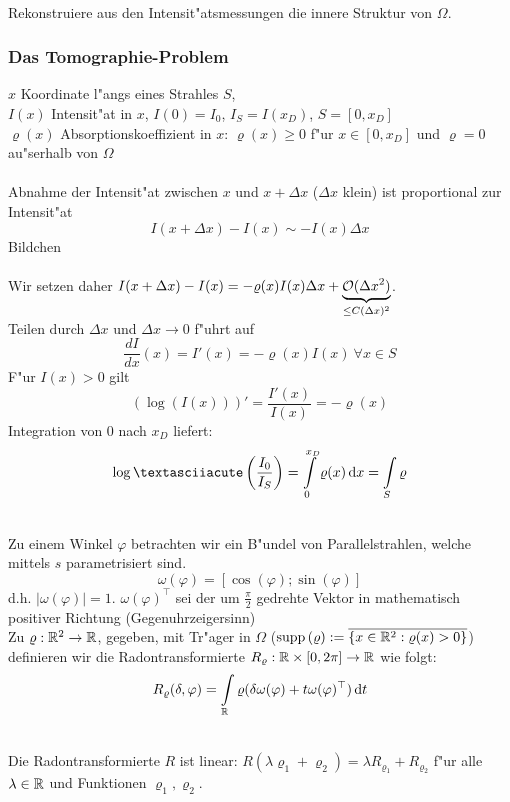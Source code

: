 \documentclass{scrartcl}
\begin{document}
 \\
Rekonstruiere aus den Intensit"atsmessungen die innere Struktur von $\Omega$.

\subsubsection{Das Tomographie-Problem}
$x$ Koordinate l"angs eines Strahles $S$, \\
$I(x)$ Intensit"at in $x$, $I(0) = I_0$, $I_S = I(x_D)$, $S = [ 0, x_D]$\\
$\varrho(x)$ Absorptionskoeffizient in $x$: $\varrho(x) \geq 0$ f"ur $x \in [0, x_D]$ und $\varrho = 0$ au"serhalb von $\Omega$ \\

 \\
Abnahme der Intensit"at zwischen $x$ und $x + \Delta x$ ($\Delta x$ klein) ist proportional zur Intensit"at 
$$I(x+ \Delta x) - I(x) \sim - I(x) \Delta x$$
Bildchen \\ \\
Wir setzen daher $I(x + \Delta x) - I(x) = - \varrho(x) I(x) \Delta x + \underbrace{\mathcal{O}(\Delta x^2)}_{\leq C(\Delta x)^2}$. \\
Teilen durch $\Delta x$ und $\Delta x \rightarrow 0$ f"uhrt auf
$$ \frac{dI}{dx}(x) = I'(x) = - \varrho(x) I(x) \ \forall x \in S$$
F"ur $I(x) > 0$ gilt
$$(\log (I(x)))' = \frac{I'(x)}{I(x)} = - \varrho(x)$$
Integration von $0$ nach $x_D$ liefert:
$$ \log´\left(\frac{I_0}{I_S}\right) = \int\limits_{0}^{x_D} \varrho(x) \d x = \int\limits_{S} \varrho$$

 \\
Zu einem Winkel $\varphi$ betrachten wir ein B"undel von Parallelstrahlen, welche mittels $s$ parametrisiert sind.
$$\omega(\varphi) = [ \cos (\varphi); \sin(\varphi) ]$$
d.h. $\vert \omega(\varphi) \vert = 1$. $\omega(\varphi)^\top$ sei der um $\frac{\pi}{2}$ gedrehte Vektor in mathematisch positiver Richtung (Gegenuhrzeigersinn) \\
Zu $\varrho: \mathbb{R}^2 \rightarrow \mathbb{R}$, gegeben, mit Tr"ager in $\Omega$ ($\mathrm{supp} \,(\varrho) := \overline{ \{ x \in \mathbb{R}^2: \varrho(x) > 0\} }$) definieren wir die Radontransformierte $R_\varrho: \mathbb{R} \times [0, 2 \pi] \rightarrow \mathbb{R}$ wie folgt:
$$R_{\varrho}(\delta, \varphi) = \int\limits_{\mathbb{R}} \varrho(\delta \omega(\varphi) + t \omega(\varphi)^\top) \, \mathrm{d} t$$

 \\
Die Radontransformierte $R$ ist linear:
$R(\lambda \varrho_1 + \varrho_2) = \lambda R_{\varrho_1} + R_{\varrho_2}$ f"ur alle $\lambda \in \mathbb{R}$ und Funktionen $\varrho_1, \varrho_2$.
\end{document}
